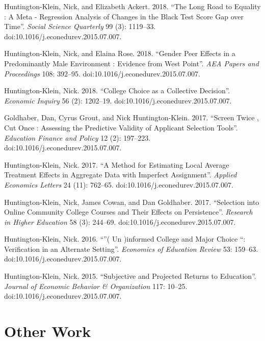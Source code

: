 \documentclass[11pt,a4paper,sans]{moderncv}
\begin{document}
 \begin{hangparas}{.25in}{1} 
 Huntington-Klein, Nick, and Elizabeth Ackert. 2018. ``The Long Road to Equality : A Meta - Regression Analysis of Changes in the Black Test Score Gap over Time''. \emph{Social Science Quarterly} 99 (3): 1119--33. doi:10.1016/j.econedurev.2015.07.007.



Huntington-Klein, Nick, and Elaina Rose. 2018. ``Gender Peer Effects in a Predominantly Male Environment : Evidence from West Point''. \emph{AEA Papers and Proceedings} 108: 392--95. doi:10.1016/j.econedurev.2015.07.007.



Huntington-Klein, Nick. 2018. ``College Choice as a Collective Decision''. \emph{Economic Inquiry} 56 (2): 1202--19. doi:10.1016/j.econedurev.2015.07.007.



Goldhaber, Dan, Cyrus Grout, and Nick Huntington-Klein. 2017. ``Screen Twice , Cut Once : Assessing the Predictive Validity of Applicant Selection Tools''. \emph{Education Finance and Policy} 12 (2): 197--223. doi:10.1016/j.econedurev.2015.07.007.



Huntington-Klein, Nick. 2017. ``A Method for Estimating Local Average Treatment Effects in Aggregate Data with Imperfect Assignment''. \emph{Applied Economics Letters} 24 (11): 762--65. doi:10.1016/j.econedurev.2015.07.007.



Huntington-Klein, Nick, James Cowan, and Dan Goldhaber. 2017. ``Selection into Online Community College Courses and Their Effects on Persistence''. \emph{Research in Higher Education} 58 (3): 244--69. doi:10.1016/j.econedurev.2015.07.007.



Huntington-Klein, Nick. 2016. ``''( Un )informed College and Major Choice ``: Verification in an Alternate Setting''. \emph{Economics of Education Review} 53: 159--63. doi:10.1016/j.econedurev.2015.07.007.



Huntington-Klein, Nick. 2015. ``Subjective and Projected Returns to Education''. \emph{Journal of Economic Behavior \& Organization} 117: 10--25. doi:10.1016/j.econedurev.2015.07.007.

 
 \end{hangparas}


\section{Other Work}  
  
\end{document}

